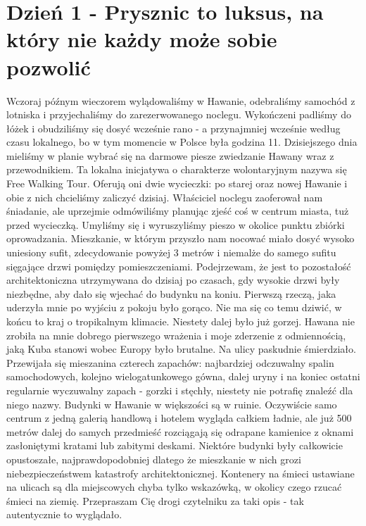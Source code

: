
\chapter[Prysznic to luksus, na który nie każdy może sobie pozwolić]{Dzień 1 - Prysznic to luksus, na który nie każdy może sobie pozwolić}

Wczoraj późnym wieczorem wylądowaliśmy w Hawanie, odebraliśmy samochód z lotniska i przyjechaliśmy do zarezerwowanego noclegu.
Wykończeni padliśmy do łóżek i obudziliśmy się dosyć wcześnie rano - a przynajmniej wcześnie według czasu lokalnego, bo w tym momencie w Polsce była godzina 11.
Dzisiejszego dnia mieliśmy w planie wybrać się na darmowe piesze zwiedzanie Hawany wraz z przewodnikiem.
Ta lokalna inicjatywa o charakterze wolontaryjnym nazywa się Free Walking Tour.
Oferują oni dwie wycieczki: po starej oraz nowej Hawanie i obie z nich chcieliśmy zaliczyć dzisiaj.
Właściciel noclegu zaoferował nam śniadanie, ale uprzejmie odmówiliśmy planując zjeść coś w centrum miasta, tuż przed wycieczką.
Umyliśmy się i wyruszyliśmy pieszo w okolice punktu zbiórki oprowadzania.
Mieszkanie, w którym przyszło nam nocować miało dosyć wysoko uniesiony sufit, zdecydowanie powyżej 3 metrów i niemalże do samego sufitu sięgające drzwi pomiędzy pomieszczeniami.
Podejrzewam, że jest to pozostałość architektoniczna utrzymywana do dzisiaj po czasach, gdy wysokie drzwi były niezbędne, aby dało się wjechać do budynku na koniu.
Pierwszą rzeczą, jaka uderzyła mnie po wyjściu z pokoju było gorąco.
Nie ma się co temu dziwić, w końcu to kraj o tropikalnym klimacie.
Niestety dalej było już gorzej.
Hawana nie zrobiła na mnie dobrego pierwszego wrażenia i moje zderzenie z odmiennością, jaką Kuba stanowi wobec Europy było brutalne.
Na ulicy paskudnie śmierdziało.
Przewijała się mieszanina czterech zapachów: najbardziej odczuwalny spalin samochodowych, kolejno wielogatunkowego gówna, dalej uryny i na koniec ostatni regularnie wyczuwalny zapach - gorzki i stęchły, niestety nie potrafię znaleźć dla niego nazwy.
Budynki w Hawanie w większości są w ruinie.
Oczywiście samo centrum z jedną galerią handlową i hotelem wygląda całkiem ładnie, ale już 500 metrów dalej do samych przedmieść rozciągają się odrapane kamienice z oknami zasłoniętymi kratami lub zabitymi deskami.
Niektóre budynki były całkowicie opustoszałe, najprawdopodobniej dlatego że mieszkanie w nich grozi niebezpieczeństwem katastrofy architektonicznej.
Kontenery na śmieci ustawiane na ulicach są dla miejscowych chyba tylko wskazówką, w okolicy czego rzucać śmieci na ziemię.
Przepraszam Cię drogi czytelniku za taki opis - tak autentycznie to wyglądało.
